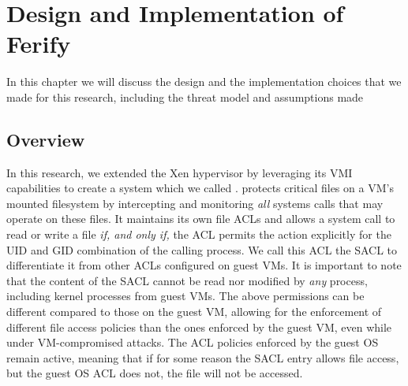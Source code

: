 {}

\chapter{Design and Implementation of Ferify}\label{ch:chapter3}

In this chapter we will discuss the design and the implementation choices that we made for this research, including the threat model and assumptions made

\section{Overview}\label{sec:overview}

\par In this research, we extended the Xen hypervisor by leveraging its \ac{VMI} capabilities to create a system which we called .  protects critical files on a \ac{VM}'s mounted filesystem by intercepting and monitoring \emph{all} systems calls that may operate on these files. It maintains its own file \acp{ACL} and allows a system call to read or write a file \emph{if, and only if,} the \ac{ACL} permits the action explicitly for the \ac{UID} and \ac{GID} combination of the calling process. We call this \ac{ACL} the \ac{SACL} to differentiate it from other \acp{ACL} configured on guest \acp{VM}. It is important to note that the content of the \ac{SACL} cannot be read nor modified by \emph{any} process, including kernel processes from guest \acp{VM}. The above permissions can be different compared to those on the guest \ac{VM}, allowing for the enforcement of different file access policies than the ones enforced by the guest \ac{VM}, even while under \ac{VM}-compromised attacks. The \ac{ACL} policies enforced by the guest \ac{OS} remain active, meaning that if for some reason the \ac{SACL} entry allows file access, but the guest \ac{OS} \ac{ACL} does not, the file will not be accessed.

